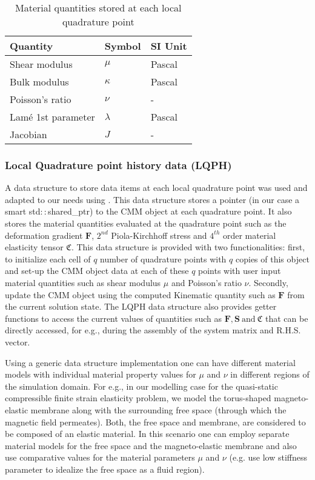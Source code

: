 \documentclass[11pt,a4paper,final]{article}
\begin{document}
\begin{table}[ht]
\centering
\begin{tabular}[c]{|C{4cm}|C{2cm}|C{2cm}|}
\hline
\textbf{Quantity} & \textbf{Symbol} & \textbf{SI Unit} \\
\hline
Shear modulus & $\mu$ & Pascal \\
\hline
Bulk modulus & $\kappa$ & Pascal \\
\hline
Poisson's ratio & $\nu$ & - \\
\hline
Lam\'e 1st parameter & $\lambda$ & Pascal \\
\hline 
Jacobian & $J$ & - \\
\hline 
\end{tabular} 
\caption{Material quantities stored at each local quadrature point}
\label{tab:1}
\end{table}

\subsubsection{Local Quadrature point history data (LQPH)}
A data structure to store data items at each local quadrature point was used and adapted to our needs using  \cite{Pelteret2012}. This data structure stores a pointer (in our case a smart std$::$shared\_ptr) to the CMM object at each quadrature point. It also stores the material quantities evaluated at the quadrature point such as the deformation gradient $\mathbf{F}$, $2^{nd}$ Piola-Kirchhoff stress and $4^{th}$ order material elasticity tensor $\mathfrak{C}$. This data structure is provided with two functionalities: first, to initialize each cell of $q$ number of quadrature points with $q$ copies of this object and set-up the CMM object data at each of these $q$ points with user input material quantities such as shear modulus $\mu$ and Poisson's ratio $\nu$. Secondly, update the CMM object using the computed Kinematic quantity such as $\mathbf{F}$ from the current solution state. The LQPH data structure also provides getter functions to access the current values of quantities such as $\mathbf{F}, \mathbf{S} \ \text{and} \ \mathfrak{C}$ that can be directly accessed, for e.g., during the assembly of the system matrix and R.H.S. vector.\par 
Using a generic data structure implementation one can have different material models with individual material property values for $\mu$ and $\nu$ in different regions of the simulation domain. For e.g., in our modelling case for the quasi-static compressible finite strain elasticity problem, we model the torus-shaped magneto-elastic membrane along with the surrounding free space (through which the magnetic field permeates). Both, the free space and membrane, are considered to be composed of an elastic material. In this scenario one can employ separate material models for the free space and the magneto-elastic membrane and also use comparative values for the material parameters $\mu$ and $\nu$ (e.g. use low stiffness parameter to idealize the free space as a fluid region). 
\end{document}
